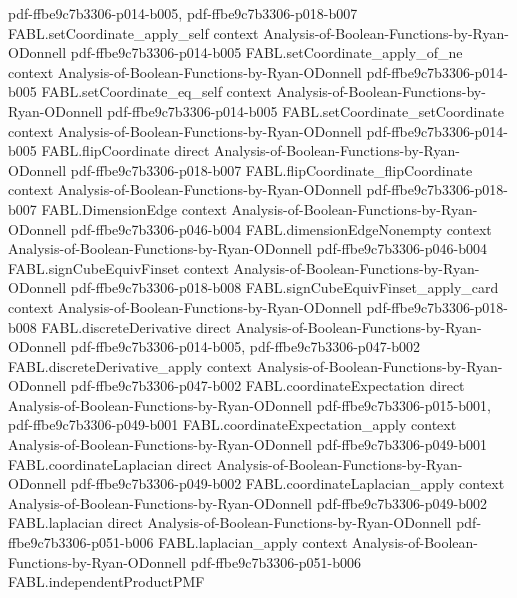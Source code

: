 \begin{theorem}
  {pdf-ffbe9c7b3306-p014-b005,
    pdf-ffbe9c7b3306-p018-b007}
\proofstep
  {FABL.setCoordinate_apply_self}
  {context}
  {Analysis-of-Boolean-Functions-by-Ryan-ODonnell}
  {pdf-ffbe9c7b3306-p014-b005}
\proofstep
  {FABL.setCoordinate_apply_of_ne}
  {context}
  {Analysis-of-Boolean-Functions-by-Ryan-ODonnell}
  {pdf-ffbe9c7b3306-p014-b005}
\proofstep
  {FABL.setCoordinate_eq_self}
  {context}
  {Analysis-of-Boolean-Functions-by-Ryan-ODonnell}
  {pdf-ffbe9c7b3306-p014-b005}
\proofstep
  {FABL.setCoordinate_setCoordinate}
  {context}
  {Analysis-of-Boolean-Functions-by-Ryan-ODonnell}
  {pdf-ffbe9c7b3306-p014-b005}
\proofstep
  {FABL.flipCoordinate}
  {direct}
  {Analysis-of-Boolean-Functions-by-Ryan-ODonnell}
  {pdf-ffbe9c7b3306-p018-b007}
\proofstep
  {FABL.flipCoordinate_flipCoordinate}
  {context}
  {Analysis-of-Boolean-Functions-by-Ryan-ODonnell}
  {pdf-ffbe9c7b3306-p018-b007}
\proofstep
  {FABL.DimensionEdge}
  {context}
  {Analysis-of-Boolean-Functions-by-Ryan-ODonnell}
  {pdf-ffbe9c7b3306-p046-b004}
\proofstep
  {FABL.dimensionEdgeNonempty}
  {context}
  {Analysis-of-Boolean-Functions-by-Ryan-ODonnell}
  {pdf-ffbe9c7b3306-p046-b004}
\proofstep
  {FABL.signCubeEquivFinset}
  {context}
  {Analysis-of-Boolean-Functions-by-Ryan-ODonnell}
  {pdf-ffbe9c7b3306-p018-b008}
\proofstep
  {FABL.signCubeEquivFinset_apply_card}
  {context}
  {Analysis-of-Boolean-Functions-by-Ryan-ODonnell}
  {pdf-ffbe9c7b3306-p018-b008}
\proofstep
  {FABL.discreteDerivative}
  {direct}
  {Analysis-of-Boolean-Functions-by-Ryan-ODonnell}
  {pdf-ffbe9c7b3306-p014-b005,
    pdf-ffbe9c7b3306-p047-b002}
\proofstep
  {FABL.discreteDerivative_apply}
  {context}
  {Analysis-of-Boolean-Functions-by-Ryan-ODonnell}
  {pdf-ffbe9c7b3306-p047-b002}
\proofstep
  {FABL.coordinateExpectation}
  {direct}
  {Analysis-of-Boolean-Functions-by-Ryan-ODonnell}
  {pdf-ffbe9c7b3306-p015-b001,
    pdf-ffbe9c7b3306-p049-b001}
\proofstep
  {FABL.coordinateExpectation_apply}
  {context}
  {Analysis-of-Boolean-Functions-by-Ryan-ODonnell}
  {pdf-ffbe9c7b3306-p049-b001}
\proofstep
  {FABL.coordinateLaplacian}
  {direct}
  {Analysis-of-Boolean-Functions-by-Ryan-ODonnell}
  {pdf-ffbe9c7b3306-p049-b002}
\proofstep
  {FABL.coordinateLaplacian_apply}
  {context}
  {Analysis-of-Boolean-Functions-by-Ryan-ODonnell}
  {pdf-ffbe9c7b3306-p049-b002}
\proofstep
  {FABL.laplacian}
  {direct}
  {Analysis-of-Boolean-Functions-by-Ryan-ODonnell}
  {pdf-ffbe9c7b3306-p051-b006}
\proofstep
  {FABL.laplacian_apply}
  {context}
  {Analysis-of-Boolean-Functions-by-Ryan-ODonnell}
  {pdf-ffbe9c7b3306-p051-b006}
\proofstep
  {FABL.independentProductPMF}

\end{theorem}
